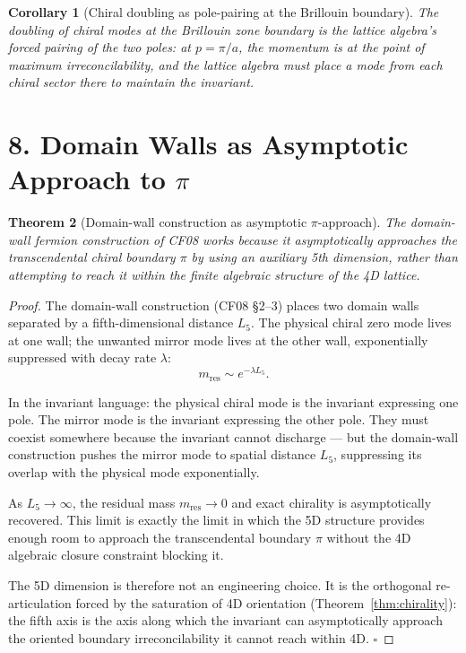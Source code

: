 \documentclass[11pt]{article}
\newtheorem{theorem}{Theorem}[section]
\newtheorem{corollary}[theorem]{Corollary}
\theoremstyle{definition}
\theoremstyle{remark}
\begin{document}
\begin{corollary}[Chiral doubling as pole-pairing at the Brillouin boundary]
The doubling of chiral modes at the Brillouin zone boundary is the
lattice algebra's forced pairing of the two poles: at $p=\pi/a$, the
momentum is at the point of maximum irreconcilability, and the lattice
algebra must place a mode from each chiral sector there to maintain
the invariant.
\end{corollary}

\section{8. Domain Walls as Asymptotic Approach to $\pi$}

\begin{theorem}[Domain-wall construction as asymptotic $\pi$-approach]\label{thm:dw}
The domain-wall fermion construction of CF08 works because it
asymptotically approaches the transcendental chiral boundary $\pi$ by
using an auxiliary 5th dimension, rather than attempting to reach it
within the finite algebraic structure of the 4D lattice.
\end{theorem}

\begin{proof}
The domain-wall construction (CF08 \S 2--3) places two domain walls
separated by a fifth-dimensional distance $L_5$. The physical chiral
zero mode lives at one wall; the unwanted mirror mode lives at the
other wall, exponentially suppressed with decay rate $\lambda$:
\[
m_{\mathrm{res}} \sim e^{-\lambda L_5}.
\]

In the invariant language: the physical chiral mode is the invariant
expressing one pole. The mirror mode is the invariant expressing the
other pole. They must coexist somewhere because the invariant cannot
discharge --- but the domain-wall construction pushes the mirror mode
to spatial distance $L_5$, suppressing its overlap with the physical
mode exponentially.

As $L_5\to\infty$, the residual mass $m_{\mathrm{res}}\to 0$ and
exact chirality is asymptotically recovered. This limit is exactly the
limit in which the 5D structure provides enough room to approach the
transcendental boundary $\pi$ without the 4D algebraic closure
constraint blocking it.

The 5D dimension is therefore not an engineering choice. It is the
orthogonal re-articulation forced by the saturation of 4D orientation
(Theorem~\ref{thm:chirality}): the fifth axis is the axis along which
the invariant can asymptotically approach the oriented boundary
irreconcilability it cannot reach within 4D. $\square$
\end{proof}
\end{document}
